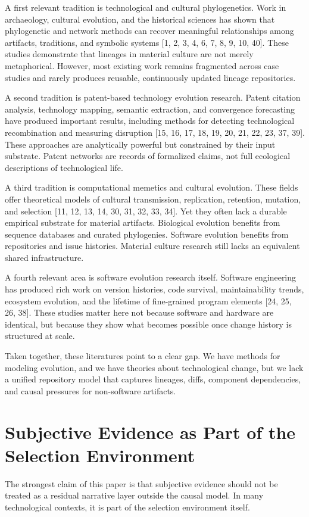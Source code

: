 \documentclass[11pt]{article}
\begin{document}
A first relevant tradition is technological and cultural phylogenetics. Work in archaeology, cultural evolution, and the historical sciences has shown that phylogenetic and network methods can recover meaningful relationships among artifacts, traditions, and symbolic systems [1, 2, 3, 4, 6, 7, 8, 9, 10, 40]. These studies demonstrate that lineages in material culture are not merely metaphorical. However, most existing work remains fragmented across case studies and rarely produces reusable, continuously updated lineage repositories.

A second tradition is patent-based technology evolution research. Patent citation analysis, technology mapping, semantic extraction, and convergence forecasting have produced important results, including methods for detecting technological recombination and measuring disruption [15, 16, 17, 18, 19, 20, 21, 22, 23, 37, 39]. These approaches are analytically powerful but constrained by their input substrate. Patent networks are records of formalized claims, not full ecological descriptions of technological life.

A third tradition is computational memetics and cultural evolution. These fields offer theoretical models of cultural transmission, replication, retention, mutation, and selection [11, 12, 13, 14, 30, 31, 32, 33, 34]. Yet they often lack a durable empirical substrate for material artifacts. Biological evolution benefits from sequence databases and curated phylogenies. Software evolution benefits from repositories and issue histories. Material culture research still lacks an equivalent shared infrastructure.

A fourth relevant area is software evolution research itself. Software engineering has produced rich work on version histories, code survival, maintainability trends, ecosystem evolution, and the lifetime of fine-grained program elements [24, 25, 26, 38]. These studies matter here not because software and hardware are identical, but because they show what becomes possible once change history is structured at scale.

Taken together, these literatures point to a clear gap. We have methods for modeling evolution, and we have theories about technological change, but we lack a unified repository model that captures lineages, diffs, component dependencies, and causal pressures for non-software artifacts.

\section{Subjective Evidence as Part of the Selection Environment}
The strongest claim of this paper is that subjective evidence should not be treated as a residual narrative layer outside the causal model. In many technological contexts, it is part of the selection environment itself.
\end{document}
